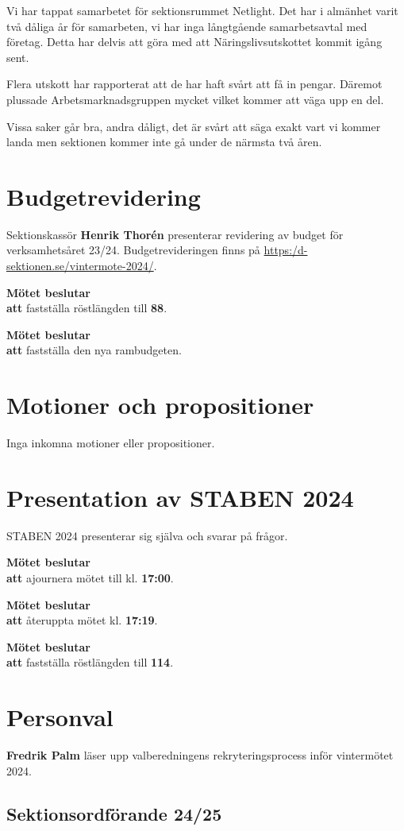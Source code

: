 \documentclass{datateknologsektionen-document}
\newcommand{\ind}{\hspace*{2em}}
\newcommand{\motetbeslutar}{\textbf{Mötet beslutar}}
\newcommand{\att}{\\\ind\textbf{att}}
\newcommand{\rostlangd}[1]{\motetbeslutar\att{} fastställa röstlängden till \textbf{#1}.}
\begin{document}
Vi har tappat samarbetet för sektionsrummet Netlight. Det har i almänhet varit två dåliga år för samarbeten, vi har inga långtgående samarbetsavtal med företag. Detta har delvis att göra med att Näringslivsutskottet kommit igång sent.

Flera utskott har rapporterat att de har haft svårt att få in pengar. Däremot plussade Arbetsmarknadsgruppen mycket vilket kommer att väga upp en del.

Vissa saker går bra, andra dåligt, det är svårt att säga exakt vart vi kommer landa men sektionen kommer inte gå under de närmsta två åren.

\section{Budgetrevidering}
Sektionskassör \textbf{Henrik Thorén} presenterar revidering av budget för verksamhetsåret 23/24. Budgetrevideringen finns på \url{https:/d-sektionen.se/vintermote-2024/}.

\rostlangd{88}

\motetbeslutar\att{} fastställa den nya rambudgeten.


\section{Motioner och propositioner}

Inga inkomna motioner eller propositioner.


\section{Presentation av STABEN 2024}

STABEN 2024 presenterar sig själva och svarar på frågor.

\motetbeslutar\att{} ajournera mötet till kl. \textbf{17:00}.

\motetbeslutar\att{} återuppta mötet kl. \textbf{17:19}.

\rostlangd{114}

\pagebreak
\section{Personval}

\textbf{Fredrik Palm} läser upp valberedningens rekryteringsprocess inför vintermötet 2024.

\subsection{Sektionsordförande 24/25}
\end{document}
